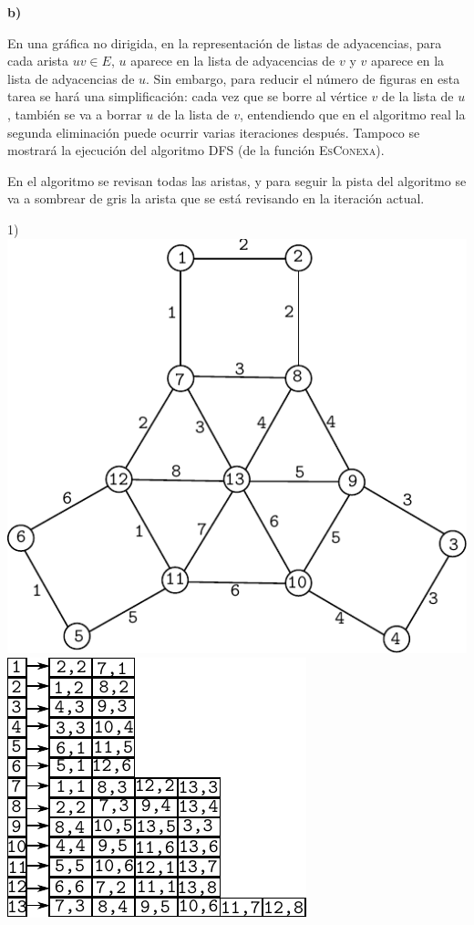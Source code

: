 \documentclass{article}
\begin{document}
\textbf{b)}

En una gráfica no dirigida, en la representación de listas de adyacencias, para cada arista $uv \in E$, $u$ aparece en la lista de adyacencias de $v$ y $v$ aparece en la lista de adyacencias de $u$. Sin embargo, para reducir el número de figuras en esta tarea se hará una simplificación: cada vez que se borre al vértice $v$ de la lista de $u$, también se va a borrar $u$ de la lista de $v$, entendiendo que en el algoritmo real la segunda eliminación puede ocurrir varias iteraciones después. Tampoco se mostrará la ejecución del algoritmo DFS (de la función \textsc{EsConexa}).

En el algoritmo se revisan todas las aristas, y para seguir la pista del algoritmo se va a sombrear de gris la arista que se está revisando en la iteración actual.

\begin{center}
1)\includegraphics[scale=0.6]{bottleneck/g1}
\hspace{5mm}
\includegraphics[scale=0.9]{bottleneck/l1}
\end{center}
\end{document}
